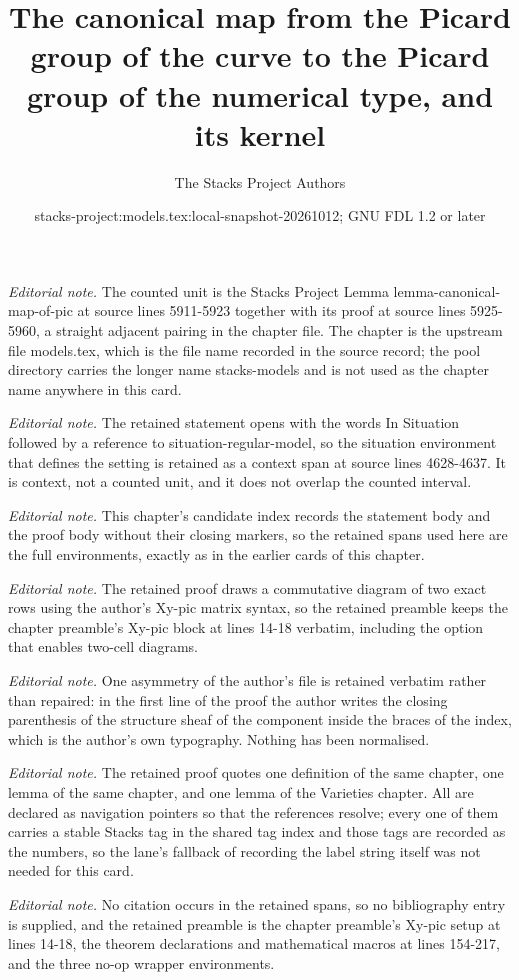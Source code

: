 \documentclass[10pt,a4paper]{amsart}
\title{The canonical map from the Picard group of the curve to the Picard group of the numerical type, and its kernel}
\author{The Stacks Project Authors}
\date{stacks-project:models.tex:local-snapshot-20261012; GNU FDL 1.2 or later}
\theoremstyle{plain}
\theoremstyle{definition}
\theoremstyle{remark}
\numberwithin{equation}{subsection}
\begin{document}
\maketitle
\noindent\textit{Editorial note.} The counted unit is the Stacks Project Lemma lemma-canonical-map-of-pic at source lines 5911-5923 together with its proof at source lines 5925-5960, a straight adjacent pairing in the chapter file. The chapter is the upstream file models.tex, which is the file name recorded in the source record; the pool directory carries the longer name stacks-models and is not used as the chapter name anywhere in this card.\par\medskip
\noindent\textit{Editorial note.} The retained statement opens with the words In Situation followed by a reference to situation-regular-model, so the situation environment that defines the setting is retained as a context span at source lines 4628-4637. It is context, not a counted unit, and it does not overlap the counted interval.\par\medskip
\noindent\textit{Editorial note.} This chapter's candidate index records the statement body and the proof body without their closing markers, so the retained spans used here are the full environments, exactly as in the earlier cards of this chapter.\par\medskip
\noindent\textit{Editorial note.} The retained proof draws a commutative diagram of two exact rows using the author's Xy-pic matrix syntax, so the retained preamble keeps the chapter preamble's Xy-pic block at lines 14-18 verbatim, including the option that enables two-cell diagrams.\par\medskip
\noindent\textit{Editorial note.} One asymmetry of the author's file is retained verbatim rather than repaired: in the first line of the proof the author writes the closing parenthesis of the structure sheaf of the component inside the braces of the index, which is the author's own typography. Nothing has been normalised.\par\medskip
\noindent\textit{Editorial note.} The retained proof quotes one definition of the same chapter, one lemma of the same chapter, and one lemma of the Varieties chapter. All are declared as navigation pointers so that the references resolve; every one of them carries a stable Stacks tag in the shared tag index and those tags are recorded as the numbers, so the lane's fallback of recording the label string itself was not needed for this card.\par\medskip
\noindent\textit{Editorial note.} No citation occurs in the retained spans, so no bibliography entry is supplied, and the retained preamble is the chapter preamble's Xy-pic setup at lines 14-18, the theorem declarations and mathematical macros at lines 154-217, and the three no-op wrapper environments.\par\medskip
\end{document}
